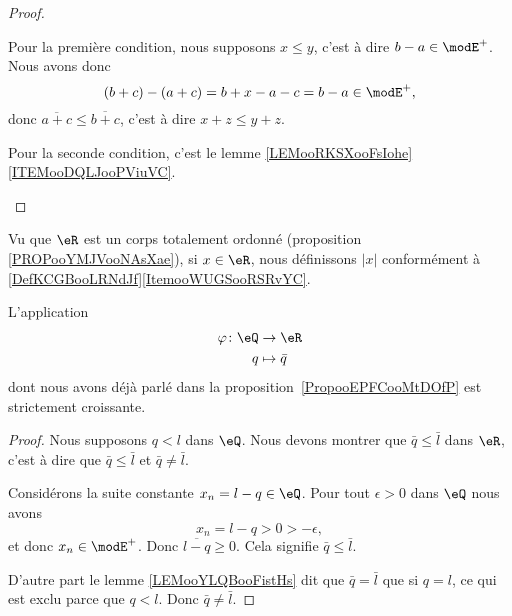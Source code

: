 \begin{proof}
\begin{subproof}
        Pour la première condition, nous supposons \( x\leq y\), c'est à dire \( b-a\in \modE^+\). Nous avons donc
        \begin{equation}
            (b+c)-(a+c)=b+x-a-c=b-a\in \modE^+,
        \end{equation}
        donc \( \overline{ a+c }\leq \overline{ b+c }\), c'est à dire \( x+z\leq y+z\).

        Pour la seconde condition, c'est le lemme \ref{LEMooRKSXooFsIohe}\ref{ITEMooDQLJooPViuVC}.
    \end{subproof}
\end{proof}


\begin{definition}
    Vu que \( \eR\) est un corps totalement ordonné (proposition \ref{PROPooYMJVooNAsXae}), si \( x\in \eR\), nous définissons \( | x |\) conformément à \ref{DefKCGBooLRNdJf}\ref{ItemooWUGSooRSRvYC}.
\end{definition}

\begin{lemma}       \label{LEMooTJAXooKEqPCG}
    L'application
    \begin{equation}
        \begin{aligned}
            \varphi\colon \eQ&\to \eR \\
            q&\mapsto \bar q
        \end{aligned}
    \end{equation}
    dont nous avons déjà parlé dans la proposition~\ref{PropooEPFCooMtDOfP} est strictement croissante.
\end{lemma}

\begin{proof}
    Nous supposons \( q< l\) dans \( \eQ\). Nous devons montrer que \( \bar q\leq \bar l\) dans \( \eR\), c'est à dire que \( \bar q\leq \bar l\) et \( \bar q\neq \bar l\).

    Considérons la suite constante \( x_n=l-q\in \eQ\). Pour tout \( \epsilon>0\) dans \( \eQ\) nous avons
    \begin{equation}
        x_n=l-q>0>-\epsilon,
    \end{equation}
    et donc \( x_n\in\modE^+\). Donc \( \overline{ l-q }\geq 0\). Cela signifie \( \bar q\leq \bar l\).

    D'autre part le lemme \ref{LEMooYLQBooFistHs} dit que \( \bar q=\bar l\) que si \( q=l\), ce qui est exclu parce que \( q<l\). Donc \( \bar q\neq\bar l\).
\end{proof}

